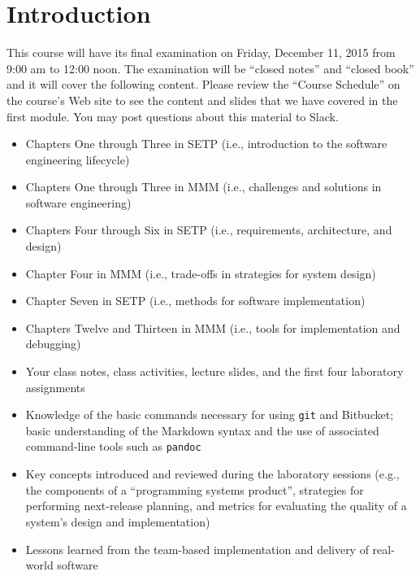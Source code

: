 


\section*{Introduction}

This course will have its final examination on Friday, December 11, 2015 from 9:00 am to 12:00 noon. The examination will
be ``closed notes'' and ``closed book'' and it will cover the following content. Please review the ``Course Schedule''
on the course's Web site to see the content and slides that we have covered in the first module. You may post questions
about this material to Slack.

\begin{itemize}

  \itemsep 0in

  \item Chapters One through Three in SETP (i.e., introduction to the software engineering lifecycle)

  \item Chapters One through Three in MMM (i.e., challenges and solutions in software engineering)

  \item Chapters Four through Six in SETP (i.e., requirements, architecture, and design)

  \item Chapter Four in MMM (i.e., trade-offs in strategies for system design)

  \item Chapter Seven in SETP (i.e., methods for software implementation)

  \item Chapters Twelve and Thirteen in MMM (i.e., tools for implementation and debugging)

  \item Your class notes, class activities, lecture slides, and the first four laboratory assignments

  \item Knowledge of the basic commands necessary for using {\tt git} and Bitbucket; basic understanding of the Markdown
    syntax and the use of associated command-line tools such as {\tt pandoc}

  \item Key concepts introduced and reviewed during the laboratory sessions (e.g., the components of a ``programming
    systems product'', strategies for performing next-release planning, and metrics for evaluating the quality of a
    system's design and implementation)

  \item Lessons learned from the team-based implementation and delivery of real-world software

\end{itemize}


